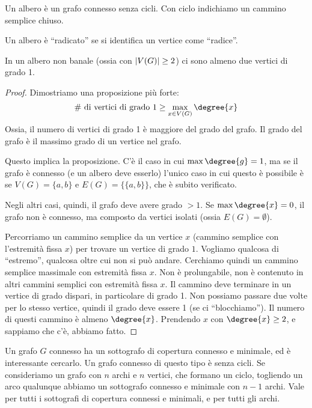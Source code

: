 \begin{defn}[Albero]
	Un albero \`e un grafo connesso senza cicli.
	Con ciclo indichiamo un cammino semplice chiuso.
\end{defn}
Un albero \`e ``radicato'' se si identifica un vertice come ``radice''.

\begin{prop}
	In un albero non banale (ossia con $\left\lvert{V(G)}\right\rvert \ge 2$) ci sono almeno due vertici di grado 1.
\end{prop}

\begin{proof}
	Dimostriamo una proposizione pi\`u forte:
	\[
		\# \text{ di vertici di grado } 1 \ge \max_{x \in V(G)} \degree{x}
	\]
	Ossia, il numero di vertici di grado 1 \`e maggiore del grado del grafo.
	Il grado del grafo \`e il massimo grado di un vertice nel grafo.

	Questo implica la proposizione. C'\`e il caso in cui $\max \degree{g} = 1$, ma se il grafo \`e connesso (e un albero deve esserlo) l'unico caso in cui questo \`e possibile \`e se $V(G) = \{a,b\}$ e $E(G) = \{\{a,b\}\}$, che \`e subito verificato.

	Negli altri casi, quindi, il grafo deve avere grado $>1$.
	Se $\max \degree{x} = 0$, il grafo non \`e connesso, ma composto da vertici isolati (ossia $E(G) = \emptyset$).

	Percorriamo un cammino semplice da un vertice $x$ (cammino semplice con l'estremit\`a fissa $x$) per trovare un vertice di grado $1$.
	Vogliamo qualcosa di ``estremo'', qualcosa oltre cui non si pu\`o andare.
	Cerchiamo quindi un cammino semplice massimale con estremit\`a fissa $x$.
	Non \`e prolungabile, non \`e contenuto in altri cammini semplici con estremit\`a fissa $x$.
	Il cammino deve terminare in un vertice di grado dispari, in particolare di grado 1.
	Non possiamo passare due volte per lo stesso vertice, quindi il grado deve essere 1 (se ci ``blocchiamo'').
	Il numero di questi cammino \`e almeno $\degree{x}$.
	Prendendo $x$ con $\degree{x} \ge 2$, e sappiamo che c'\`e, abbiamo fatto.
\end{proof}

Un grafo $G$ connesso ha un sottografo di copertura connesso e minimale, ed \`e interessante cercarlo.
Un grafo connesso di questo tipo \`e senza cicli.
Se consideriamo un grafo con $n$ archi e $n$ vertici, che formano un ciclo, togliendo un arco qualunque abbiamo un sottografo connesso e minimale con $n-1$ archi.
Vale per tutti i sottografi di copertura connessi e minimali, e per tutti gli archi.

